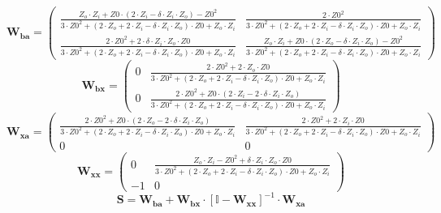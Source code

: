 \[ \mathbf{W_{ba}} = \left(\begin{smallmatrix} \frac{Z_o\cdot Z_i+Z0\cdot \left(2\cdot Z_i-\delta\cdot Z_i\cdot Z_o\right)-Z0^2}{3\cdot Z0^2+\left(2\cdot Z_o+2\cdot Z_i-\delta\cdot Z_i\cdot Z_o\right)\cdot Z0+Z_o\cdot Z_i} & \frac{2\cdot Z0^2}{3\cdot Z0^2+\left(2\cdot Z_o+2\cdot Z_i-\delta\cdot Z_i\cdot Z_o\right)\cdot Z0+Z_o\cdot Z_i} \\ \frac{2\cdot Z0^2+2\cdot \delta\cdot Z_i\cdot Z_o\cdot Z0}{3\cdot Z0^2+\left(2\cdot Z_o+2\cdot Z_i-\delta\cdot Z_i\cdot Z_o\right)\cdot Z0+Z_o\cdot Z_i} & \frac{Z_o\cdot Z_i+Z0\cdot \left(2\cdot Z_o-\delta\cdot Z_i\cdot Z_o\right)-Z0^2}{3\cdot Z0^2+\left(2\cdot Z_o+2\cdot Z_i-\delta\cdot Z_i\cdot Z_o\right)\cdot Z0+Z_o\cdot Z_i} \end{smallmatrix}\right) \]
\[ \mathbf{W_{bx}} = \left(\begin{smallmatrix} 0 & \frac{2\cdot Z0^2+2\cdot Z_o\cdot Z0}{3\cdot Z0^2+\left(2\cdot Z_o+2\cdot Z_i-\delta\cdot Z_i\cdot Z_o\right)\cdot Z0+Z_o\cdot Z_i} \\ 0 & \frac{2\cdot Z0^2+Z0\cdot \left(2\cdot Z_i-2\cdot \delta\cdot Z_i\cdot Z_o\right)}{3\cdot Z0^2+\left(2\cdot Z_o+2\cdot Z_i-\delta\cdot Z_i\cdot Z_o\right)\cdot Z0+Z_o\cdot Z_i} \end{smallmatrix}\right) \]
\[ \mathbf{W_{xa}} = \left(\begin{smallmatrix} \frac{2\cdot Z0^2+Z0\cdot \left(2\cdot Z_o-2\cdot \delta\cdot Z_i\cdot Z_o\right)}{3\cdot Z0^2+\left(2\cdot Z_o+2\cdot Z_i-\delta\cdot Z_i\cdot Z_o\right)\cdot Z0+Z_o\cdot Z_i} & \frac{2\cdot Z0^2+2\cdot Z_i\cdot Z0}{3\cdot Z0^2+\left(2\cdot Z_o+2\cdot Z_i-\delta\cdot Z_i\cdot Z_o\right)\cdot Z0+Z_o\cdot Z_i} \\ 0 & 0 \end{smallmatrix}\right) \]
\[ \mathbf{W_{xx}} = \left(\begin{smallmatrix} 0 & \frac{Z_o\cdot Z_i-Z0^2+\delta\cdot Z_i\cdot Z_o\cdot Z0}{3\cdot Z0^2+\left(2\cdot Z_o+2\cdot Z_i-\delta\cdot Z_i\cdot Z_o\right)\cdot Z0+Z_o\cdot Z_i} \\ -1 & 0 \end{smallmatrix}\right) \]
\[ \mathbf{S}=\mathbf{W_{ba}}+\mathbf{W_{bx}}\cdot\left[ \mathbb{I}  -\mathbf{W_{xx}}\right]^{-1}\cdot\mathbf{W_{xa}} \]
